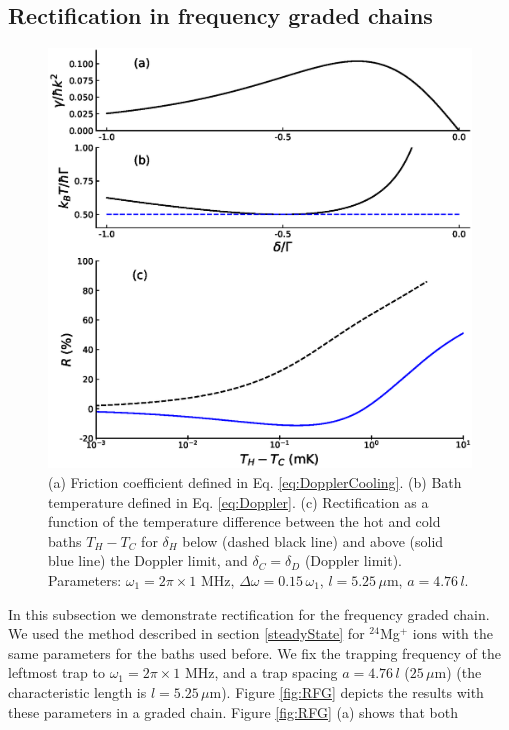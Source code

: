 \subsection{Rectification in frequency graded chains \label{GradedChains}}
%
%
\begin{figure}
    \includegraphics[width=\linewidth]{Figures/R_as_function_of_TemperatureBias.eps}
    \caption{ (a) Friction coefficient defined in Eq. \eqref{eq:DopplerCooling}. (b) Bath temperature defined in Eq. \eqref{eq:Doppler}. (c) Rectification as a function of the temperature difference between the hot and cold baths $T_H -T_C$ for $\delta_H$ below (dashed black line) and above (solid blue line) the Doppler limit, and $\delta_C=\delta_D$ (Doppler limit). Parameters: $\omega_1 = 2 \pi \times 1$ MHz, $\Delta \omega = 0.15 \, \omega_1$, $l = 5.25\,\mu$m, $a = 4.76 \, l$.}
    \label{fig:RD}
\end{figure}
%
In this subsection we demonstrate rectification for the frequency graded chain. We  used the method described in section \ref{steadyState} for $^{24}$Mg$^+$ ions with the same parameters for the baths used before. We fix the trapping frequency of the leftmost trap to $\omega_1 = 2\pi \times 1$ MHz, and a trap spacing $a = 4.76\, l$ ($25\,\mu$m) (the  characteristic length is $l = 5.25\,\mu$m). Figure \ref{fig:RFG} depicts  the results with these parameters in a graded chain. Figure \ref{fig:RFG} (a) shows that both
